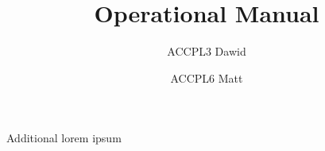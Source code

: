 \documentclass[revision=2309.1]{inop}
\title{Operational Manual}
\author{ACCPL3 Dawid\and ACCPL6 Matt}
\date{\revision}
\begin{document}
\frontmatter%

\tableofcontents

\mainmatter%


\backmatter%
Additional lorem ipsum
\end{document}
